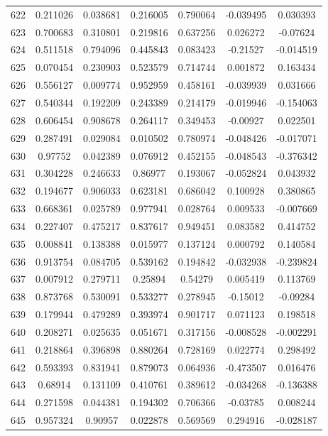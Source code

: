\begin{table}
\begin{tabular}{c|c|c|c|c|c|c}
622 & 0.211026 & 0.038681 & 0.216005 & 0.790064 & -0.039495 & 0.030393\\
623 & 0.700683 & 0.310801 & 0.219816 & 0.637256 & 0.026272 & -0.07624\\
624 & 0.511518 & 0.794096 & 0.445843 & 0.083423 & -0.21527 & -0.014519\\
625 & 0.070454 & 0.230903 & 0.523579 & 0.714744 & 0.001872 & 0.163434\\
626 & 0.556127 & 0.009774 & 0.952959 & 0.458161 & -0.039939 & 0.031666\\
627 & 0.540344 & 0.192209 & 0.243389 & 0.214179 & -0.019946 & -0.154063\\
628 & 0.606454 & 0.908678 & 0.264117 & 0.349453 & -0.00927 & 0.022501\\
629 & 0.287491 & 0.029084 & 0.010502 & 0.780974 & -0.048426 & -0.017071\\
630 & 0.97752 & 0.042389 & 0.076912 & 0.452155 & -0.048543 & -0.376342\\
631 & 0.304228 & 0.246633 & 0.86977 & 0.193067 & -0.052824 & 0.043932\\
632 & 0.194677 & 0.906033 & 0.623181 & 0.686042 & 0.100928 & 0.380865\\
633 & 0.668361 & 0.025789 & 0.977941 & 0.028764 & 0.009533 & -0.007669\\
634 & 0.227407 & 0.475217 & 0.837617 & 0.949451 & 0.083582 & 0.414752\\
635 & 0.008841 & 0.138388 & 0.015977 & 0.137124 & 0.000792 & 0.140584\\
636 & 0.913754 & 0.084705 & 0.539162 & 0.194842 & -0.032938 & -0.239824\\
637 & 0.007912 & 0.279711 & 0.25894 & 0.54279 & 0.005419 & 0.113769\\
638 & 0.873768 & 0.530091 & 0.533277 & 0.278945 & -0.15012 & -0.09284\\
639 & 0.179944 & 0.479289 & 0.393974 & 0.901717 & 0.071123 & 0.198518\\
640 & 0.208271 & 0.025635 & 0.051671 & 0.317156 & -0.008528 & -0.002291\\
641 & 0.218864 & 0.396898 & 0.880264 & 0.728169 & 0.022774 & 0.298492\\
642 & 0.593393 & 0.831941 & 0.879073 & 0.064936 & -0.473507 & 0.016476\\
643 & 0.68914 & 0.131109 & 0.410761 & 0.389612 & -0.034268 & -0.136388\\
644 & 0.271598 & 0.044381 & 0.194302 & 0.706366 & -0.03785 & 0.008244\\
645 & 0.957324 & 0.90957 & 0.022878 & 0.569569 & 0.294916 & -0.028187\\

\end{tabular}
\end{table}
